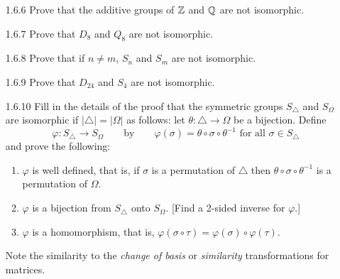 \begin{enumerate}
      \textbf{Proof.} Since $|\R| \neq |\Q|$, it follows that $(\R, +)$ and
      $(\Q, +)$ are not isomorphic. \qed
   \item[1.6.6]   Prove that the additive groups of $\mathbb{Z}$ and $\mathbb{Q}$ are not
                  isomorphic.
   \item[1.6.7]   Prove that $D_8$ and $Q_8$ are not isomorphic.
   \item[1.6.8]   Prove that if $n \neq m$, $S_n$ and $S_m$ are not isomorphic.
   \item[1.6.9]   Prove that $D_{24}$ and $S_4$ are not isomorphic.
   \item[1.6.10]  Fill in the details of the proof that the symmetric groups
                  $S_{\triangle}$ and $S_{\Omega}$ are isomorphic if
                  $|\triangle| = |\Omega|$ as follows: let
                  $\theta : \triangle \rightarrow \Omega$ be a bijection. Define
                  $$\varphi : S_{\triangle} \rightarrow S_{\Omega} \qquad
                    \text{by} \qquad \varphi(\sigma) = \theta \circ \sigma \circ 
                    \theta^{-1} \text{ for all } \sigma \in S_{\triangle}$$
                  and prove the following:
                  \begin{enumerate}
                     \item $\varphi$ is well defined, that is, if $\sigma$ is a
                           permutation of $\triangle$ then
                           $\theta\circ\sigma\circ\theta^{-1}$ is a permutation
                           of $\Omega$.
                     \item $\varphi$ is a bijection from $S_{\triangle}$ onto
                           $S_{\Omega}$. [Find a 2-sided inverse for $\varphi$.]
                     \item $\varphi$ is a homomorphism, that is,
                           $\varphi(\sigma\circ\tau) =
                            \varphi(\sigma)\circ\varphi(\tau)$.
                  \end{enumerate}
                  Note the similarity to the \textit{change of basis} or
                  \textit{similarity} transformations for matrices. 

\end{enumerate}
